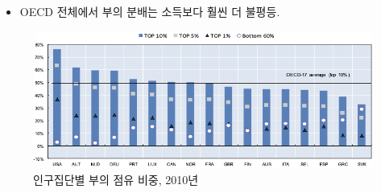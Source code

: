 \documentclass[aspectratio=169,xcolor=dvipsnames,handout]{beamer}
\begin{document}
\begin{frame}{}
    \begin{itemize}
        \item OECD 전체에서 부의 분배는 소득보다 훨씬 더 불평등. 
    \end{itemize}
    \begin{figure}
        \centering
        \includegraphics[scale=.3]{pic/tpin2.6.png}
        \caption{인구집단별 부의 점유 비중, 2010년}
    \end{figure}
\end{frame}
\end{document}
